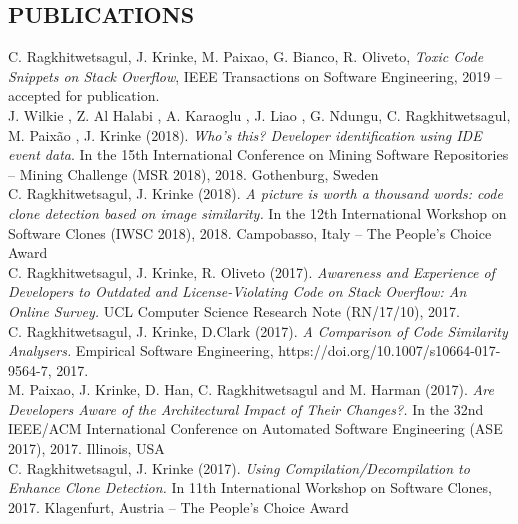 \documentclass[margin, 10pt]{res} %
\begin{document}
\begin{resume}

\section{PUBLICATIONS}  

C. Ragkhitwetsagul, J. Krinke, M. Paixao, G. Bianco, R. Oliveto, \textit{Toxic Code Snippets on Stack Overflow}, IEEE Transactions on Software Engineering, 2019 -- accepted for publication.
\vspace{2mm} \\
J. Wilkie , Z. Al Halabi , A. Karaoglu , J. Liao , G. Ndungu, C. Ragkhitwetsagul, M. Paixão , J. Krinke (2018). \textit{Who's this? Developer identification using IDE event data}. In the 15th International Conference on Mining Software Repositories -- Mining Challenge (MSR 2018), 2018. Gothenburg, Sweden 
\vspace{2mm} \\
C. Ragkhitwetsagul, J. Krinke (2018). \textit{A picture is worth a thousand words: code clone detection based on image similarity.} In the 12th International Workshop on Software Clones (IWSC 2018), 2018. Campobasso, Italy -- The People's Choice Award\vspace{2mm} \\
C. Ragkhitwetsagul, J. Krinke, R. Oliveto (2017). \textit{Awareness and Experience of Developers to Outdated and License-Violating Code on Stack Overflow: An Online Survey.} UCL Computer Science Research Note (RN/17/10), 2017. \vspace{2mm} \\
C. Ragkhitwetsagul, J. Krinke, D.Clark (2017). \textit{A Comparison of Code Similarity Analysers.} Empirical Software Engineering, https://doi.org/10.1007/s10664-017-9564-7, 2017. \vspace{2mm} \\
M. Paixao, J. Krinke, D. Han, C. Ragkhitwetsagul and M. Harman (2017). \textit{Are Developers Aware of the Architectural Impact of Their Changes?.} In the 32nd IEEE/ACM International Conference on Automated Software Engineering (ASE 2017), 2017. Illinois, USA \vspace{2mm} \\
C. Ragkhitwetsagul, J. Krinke (2017). \textit{Using Compilation/Decompilation to Enhance Clone Detection.} In 11th International Workshop on Software Clones, 2017. Klagenfurt, Austria -- The People's Choice Award \vspace{2mm} \\

\end{resume}
\end{document}
